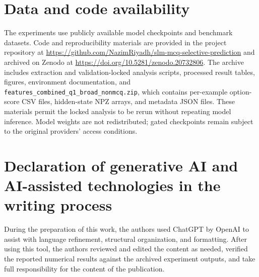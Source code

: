 \documentclass[preprint,12pt,authoryear]{elsarticle}
\begin{document}
\section*{Data and code availability}
The experiments use publicly available model checkpoints and benchmark datasets. Code and reproducibility materials are provided in the project repository at \url{https://github.com/NazimRiyadh/slm-mcq-selective-prediction} and archived on Zenodo at \url{https://doi.org/10.5281/zenodo.20732806}. The archive includes extraction and validation-locked analysis scripts, processed result tables, figures, environment documentation, and \texttt{features\_combined\_q1\_broad\_nonmcq.zip}, which contains per-example option-score CSV files, hidden-state NPZ arrays, and metadata JSON files. These materials permit the locked analysis to be rerun without repeating model inference. Model weights are not redistributed; gated checkpoints remain subject to the original providers' access conditions.

\section*{Declaration of generative AI and AI-assisted technologies in the writing process}
During the preparation of this work, the authors used ChatGPT by OpenAI to assist with language refinement, structural organization, and formatting. After using this tool, the authors reviewed and edited the content as needed, verified the reported numerical results against the archived experiment outputs, and take full responsibility for the content of the publication.
\end{document}
